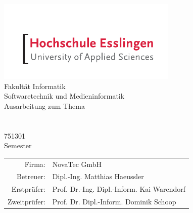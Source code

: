 \begin{titlepage}
	\begin{center}
		\includegraphics[scale=2.5]{bilder/hs-logo.pdf}\\
		\vspace{1cm} \Large Fakultät Informatik\\
		\vspace{0.5cm} \Large Softwaretechnik und Medieninformatik\\
		\vspace{1.25cm} \Large Ausarbeitung zum Thema\\
		\vspace{0.5cm} \Huge \thetitle \\
		\vspace{1.5cm} \Large \theauthor \\
		\vspace{0.2cm} \small 751301\\
		\vspace{0.5cm} \normalsize Semester \the\year\\
		\vfill
		
		\begin{tabular}{rl}
			Firma: & NovaTec GmbH\\ [0.1cm]
			Betreuer: & Dipl.-Ing. Matthias Haeussler\\ [0.5cm]
			Erstprüfer: & Prof. Dr.-Ing. Dipl.-Inform. Kai Warendorf \\ [0.1cm]
			Zweitprüfer: & Prof. Dr. Dipl.-Inform. Dominik Schoop\\[0.5cm]
		\end{tabular}
	\end{center}
\end{titlepage}